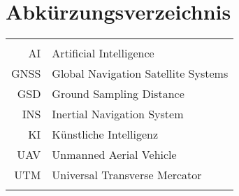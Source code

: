 \vspace*{-0.5cm}

\section*{Abkürzungsverzeichnis}

\vspace{0.5cm}

\begin{flushleft} %
	\begin{tabular}{r|l}
		\noindent 			&			\\
		\noindent AI		& Artificial Intelligence \\
		\noindent GNSS		& Global Navigation Satellite Systems \\	
		\noindent GSD		& Ground Sampling Distance \\
		\noindent INS		& Inertial Navigation System \\
		\noindent KI		& Künstliche Intelligenz \\
		\noindent UAV		& Unmanned Aerial Vehicle \\
		\noindent UTM		& Universal Transverse Mercator \\
		\noindent 			&			
	\end{tabular}
\end{flushleft}
